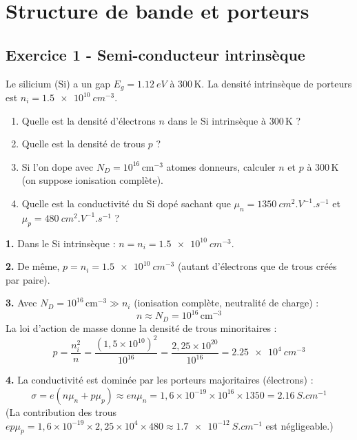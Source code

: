 \documentclass[12pt,a4paper]{article}
\begin{document}
\newpage
\section{Structure de bande et porteurs}

\subsection*{Exercice 1 - Semi-conducteur intrinsèque \niveau{\facile}}

\begin{boiteexercice}
Le silicium (Si) a un gap $E_g = \qty{1.12}{eV}$ à 300\,K. La densité intrinsèque de porteurs est $n_i = \qty{1.5e10}{cm^{-3}}$.
\begin{enumerate}
  \item Quelle est la densité d'électrons $n$ dans le Si intrinsèque à 300\,K ?
  \item Quelle est la densité de trous $p$ ?
  \item Si l'on dope avec $N_D = 10^{16}\,\text{cm}^{-3}$ atomes donneurs, calculer $n$ et $p$ à 300\,K (on suppose ionisation complète).
  \item Quelle est la conductivité du Si dopé sachant que $\mu_n = \qty{1350}{cm^2.V^{-1}.s^{-1}}$ et $\mu_p = \qty{480}{cm^2.V^{-1}.s^{-1}}$ ?
\end{enumerate}
\end{boiteexercice}

\begin{boitecorrige}
\textbf{1.} Dans le Si intrinsèque : $n = n_i = \qty{1.5e10}{cm^{-3}}$.

\textbf{2.} De même, $p = n_i = \qty{1.5e10}{cm^{-3}}$ (autant d'électrons que de trous créés par paire).

\textbf{3.} Avec $N_D = 10^{16}\,\text{cm}^{-3} \gg n_i$ (ionisation complète, neutralité de charge) :
\[
n \approx N_D = 10^{16}\,\text{cm}^{-3}
\]
La loi d'action de masse donne la densité de trous minoritaires :
\[
p = \frac{n_i^2}{n} = \frac{(1{,}5\times10^{10})^2}{10^{16}} = \frac{2{,}25\times10^{20}}{10^{16}} = \qty{2.25e4}{cm^{-3}}
\]

\textbf{4.} La conductivité est dominée par les porteurs majoritaires (électrons) :
\[
\sigma = e(n\mu_n + p\mu_p) \approx en\mu_n = 1{,}6\times10^{-19}\times10^{16}\times1350 = \qty{2.16}{S.cm^{-1}}
\]
(La contribution des trous $ep\mu_p = 1{,}6\times10^{-19}\times2{,}25\times10^4\times480 \approx \qty{1.7e-12}{S.cm^{-1}}$ est négligeable.)
\end{boitecorrige}
\end{document}

